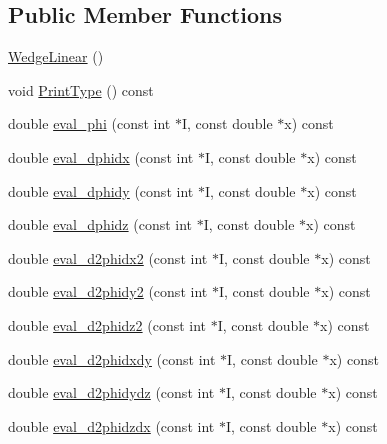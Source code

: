 \subsection*{Public Member Functions}
\begin{DoxyCompactItemize}
\item 
\mbox{\hyperlink{classfemus_1_1_wedge_linear_a7d7da7ba7e371b2d4179fba542dee171}{Wedge\+Linear}} ()
\item 
void \mbox{\hyperlink{classfemus_1_1_wedge_linear_a0f4d7583a8442ee5019cf63b70a3eb26}{Print\+Type}} () const
\item 
double \mbox{\hyperlink{classfemus_1_1_wedge_linear_a43a10867684e0d86006836afb3cd02ec}{eval\+\_\+phi}} (const int $\ast$I, const double $\ast$x) const
\item 
double \mbox{\hyperlink{classfemus_1_1_wedge_linear_a0a071d2e692526b8eb39ce5c3c41adf4}{eval\+\_\+dphidx}} (const int $\ast$I, const double $\ast$x) const
\item 
double \mbox{\hyperlink{classfemus_1_1_wedge_linear_a34ad0ff19e2763f3823814c05fcb44c2}{eval\+\_\+dphidy}} (const int $\ast$I, const double $\ast$x) const
\item 
double \mbox{\hyperlink{classfemus_1_1_wedge_linear_aedbe9536bad4b99ef918810e6d0d6689}{eval\+\_\+dphidz}} (const int $\ast$I, const double $\ast$x) const
\item 
double \mbox{\hyperlink{classfemus_1_1_wedge_linear_a3d9966a1518937773d444bc5c449ce35}{eval\+\_\+d2phidx2}} (const int $\ast$I, const double $\ast$x) const
\item 
double \mbox{\hyperlink{classfemus_1_1_wedge_linear_aa175c8d902c2a4a511d6bf798fb003c3}{eval\+\_\+d2phidy2}} (const int $\ast$I, const double $\ast$x) const
\item 
double \mbox{\hyperlink{classfemus_1_1_wedge_linear_a055172338aa9af21099a59e6ebfbb64e}{eval\+\_\+d2phidz2}} (const int $\ast$I, const double $\ast$x) const
\item 
double \mbox{\hyperlink{classfemus_1_1_wedge_linear_a6b3c2d2415f2fc5c92e7c55a2726c481}{eval\+\_\+d2phidxdy}} (const int $\ast$I, const double $\ast$x) const
\item 
double \mbox{\hyperlink{classfemus_1_1_wedge_linear_a9f9a44123df2166e874a72a1b64e2366}{eval\+\_\+d2phidydz}} (const int $\ast$I, const double $\ast$x) const
\item 
double \mbox{\hyperlink{classfemus_1_1_wedge_linear_aaaf11342fc350204f931c19b8241c913}{eval\+\_\+d2phidzdx}} (const int $\ast$I, const double $\ast$x) const
\end{DoxyCompactItemize}
